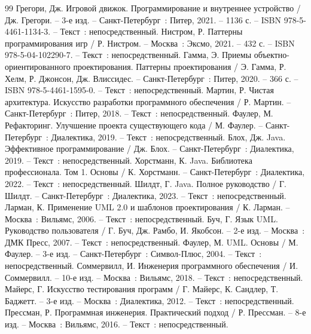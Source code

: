 
\begin{thebibliography}{99}
	 Грегори, Дж. Игровой движок. Программирование и внутреннее устройство / Дж. Грегори. -- 3-е изд. -- Санкт-Петербург~: Питер, 2021. -- 1136 с. -- ISBN 978-5-4461-1134-3. -- Текст~: непосредственный.
	 Нистром, Р. Паттерны программирования игр / Р. Нистром. -- Москва~: Эксмо, 2021. -- 432 с. -- ISBN 978-5-04-102290-7. -- Текст~: непосредственный.
	 Гамма, Э. Приемы объектно-ориентированного проектирования. Паттерны проектирования / Э. Гамма, Р. Хелм, Р. Джонсон, Дж. Влиссидес. -- Санкт-Петербург~: Питер, 2020. -- 366 с. -- ISBN 978-5-4461-1595-0. -- Текст~: непосредственный.
	 Мартин, Р. Чистая архитектура. Искусство разработки программного обеспечения / Р. Мартин. -- Санкт-Петербург~: Питер, 2018. -- Текст~: непосредственный.
	 Фаулер, М. Рефакторинг. Улучшение проекта существующего кода / М. Фаулер. -- Санкт-Петербург~: Диалектика, 2019. -- Текст~: непосредственный.
	 Блох, Дж. Java. Эффективное программирование / Дж. Блох. -- Санкт-Петербург~: Диалектика, 2019. -- Текст~: непосредственный.
	 Хорстманн, К. Java. Библиотека профессионала. Том 1. Основы / К. Хорстманн. -- Санкт-Петербург~: Диалектика, 2022. -- Текст~: непосредственный.
	 Шилдт, Г. Java. Полное руководство / Г. Шилдт. -- Санкт-Петербург~: Диалектика, 2023. -- Текст~: непосредственный.
	 Ларман, К. Применение UML 2.0 и шаблонов проектирования / К. Ларман. -- Москва~: Вильямс, 2006. -- Текст~: непосредственный.
	 Буч, Г. Язык UML. Руководство пользователя / Г. Буч, Дж. Рамбо, И. Якобсон. -- 2-е изд. -- Москва~: ДМК Пресс, 2007. -- Текст~: непосредственный.
	 Фаулер, М. UML. Основы / М. Фаулер. -- 3-е изд. -- Санкт-Петербург~: Символ-Плюс, 2004. -- Текст~: непосредственный.
	 Соммервилл, И. Инженерия программного обеспечения / И. Соммервилл. -- 10-е изд. -- Москва~: Вильямс, 2018. -- Текст~: непосредственный.
	 Майерс, Г. Искусство тестирования программ / Г. Майерс, К. Сандлер, Т. Баджетт. -- 3-е изд. -- Москва~: Диалектика, 2012. -- Текст~: непосредственный.
	 Прессман, Р. Программная инженерия. Практический подход / Р. Прессман. -- 8-е изд. -- Москва~: Вильямс, 2016. -- Текст~: непосредственный.

\end{thebibliography}
